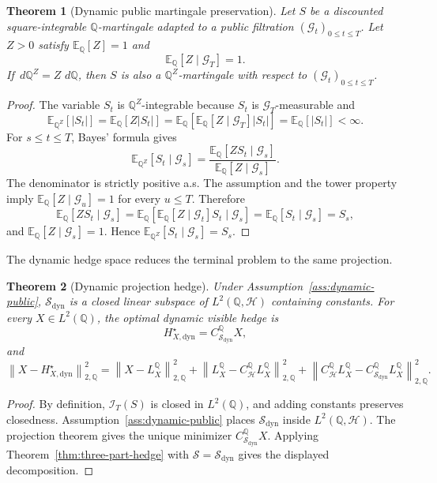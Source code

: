 \documentclass[11pt,a4paper]{amsart}
\theoremstyle{plain}
\newtheorem{theorem}{Theorem}[section]
\theoremstyle{definition}
\theoremstyle{remark}
\newcommand{\QQ}{\mathbb{Q}}
\newcommand{\EE}{\mathbb{E}}
\newcommand{\cG}{\mathcal{G}}
\newcommand{\cH}{\mathcal{H}}
\newcommand{\cI}{\mathcal{I}}
\newcommand{\cS}{\mathcal{S}}
\newcommand{\dd}{\,d}
\newcommand{\norm}[1]{\left\lVert #1\right\rVert}
\begin{document}
\begin{theorem}[Dynamic public martingale preservation]\label{thm:dynamic-martingale-preservation}
Let \(S\) be a discounted square-integrable \(\QQ\)-martingale adapted to a public filtration
\((\cG_t)_{0\le t\le T}\).  Let \(Z>0\) satisfy \(\EE_\QQ[Z]=1\) and
\[
        \EE_\QQ[Z\mid\cG_T]=1.
\]
If \(\dd\QQ^Z=Z\,\dd\QQ\), then \(S\) is also a \(\QQ^Z\)-martingale with respect to
\((\cG_t)_{0\le t\le T}\).
\end{theorem}

\begin{proof}
The variable \(S_t\) is \(\QQ^Z\)-integrable because \(S_t\) is \(\cG_T\)-measurable and
\[
        \EE_{\QQ^Z}[|S_t|]
        =
        \EE_\QQ[Z|S_t|]
        =
        \EE_\QQ[\EE_\QQ[Z\mid\cG_T]|S_t|]
        =
        \EE_\QQ[|S_t|]<\infty.
\]
For \(s\le t\le T\), Bayes' formula gives
\[
        \EE_{\QQ^Z}[S_t\mid\cG_s]
        =
        \frac{\EE_\QQ[ZS_t\mid\cG_s]}{\EE_\QQ[Z\mid\cG_s]}.
\]
The denominator is strictly positive a.s.  The assumption and the tower property imply
\(\EE_\QQ[Z\mid\cG_u]=1\) for every \(u\le T\).
Therefore
\[
        \EE_\QQ[ZS_t\mid\cG_s]
        =
        \EE_\QQ[\EE_\QQ[Z\mid\cG_t]S_t\mid\cG_s]
        =
        \EE_\QQ[S_t\mid\cG_s]
        =
        S_s,
\]
and \(\EE_\QQ[Z\mid\cG_s]=1\).  Hence
\(\EE_{\QQ^Z}[S_t\mid\cG_s]=S_s\).
\end{proof}

The dynamic hedge space reduces the terminal problem to the same projection.

\begin{theorem}[Dynamic projection hedge]\label{thm:dynamic-projection-hedge}
Under Assumption~\ref{ass:dynamic-public}, \(\cS_{\mathrm{dyn}}\) is a closed linear subspace of
\(L^2(\QQ,\cH)\) containing constants.  For every \(X\in L^2(\QQ)\), the optimal dynamic visible
hedge is
\[
        H_{X,\mathrm{dyn}}^\star
        =
        C_{\cS_{\mathrm{dyn}}}^{\QQ}X,
\]
and
\[
        \norm{X-H_{X,\mathrm{dyn}}^\star}_{2,\QQ}^2
        =
        \norm{X-L_X^\QQ}_{2,\QQ}^2
        +
        \norm{L_X^\QQ-C_{\cH}^{\QQ}L_X^\QQ}_{2,\QQ}^2
        +
        \norm{C_{\cH}^{\QQ}L_X^\QQ-C_{\cS_{\mathrm{dyn}}}^{\QQ}L_X^\QQ}_{2,\QQ}^2.
\]
\end{theorem}

\begin{proof}
By definition, \(\cI_T(S)\) is closed in \(L^2(\QQ)\), and adding constants preserves closedness.
Assumption~\ref{ass:dynamic-public} places \(\cS_{\mathrm{dyn}}\) inside \(L^2(\QQ,\cH)\).  The
projection theorem gives the unique minimizer \(C_{\cS_{\mathrm{dyn}}}^{\QQ}X\).  Applying
Theorem~\ref{thm:three-part-hedge} with \(\cS=\cS_{\mathrm{dyn}}\) gives the displayed
decomposition.
\end{proof}
\end{document}
